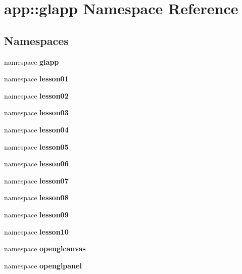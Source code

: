 \section{app::glapp Namespace Reference}
\label{namespaceapp_1_1glapp}


\subsection*{Namespaces}
\begin{CompactItemize}
\item 
namespace {\bf glapp}
\item 
namespace {\bf lesson01}
\item 
namespace {\bf lesson02}
\item 
namespace {\bf lesson03}
\item 
namespace {\bf lesson04}
\item 
namespace {\bf lesson05}
\item 
namespace {\bf lesson06}
\item 
namespace {\bf lesson07}
\item 
namespace {\bf lesson08}
\item 
namespace {\bf lesson09}
\item 
namespace {\bf lesson10}
\item 
namespace {\bf openglcanvas}
\item 
namespace {\bf openglpanel}
\end{CompactItemize}
